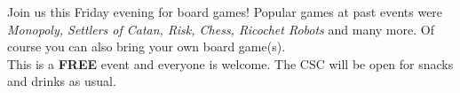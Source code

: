 \documentclass{article}
\begin{document}


Join us this Friday evening for board games! Popular games at past events were \emph{Monopoly, Settlers of Catan, Risk, Chess, Ricochet Robots} and many more. Of course you can also bring your own board game(s).\\

This is a \textbf{FREE} event and everyone is welcome. The CSC will be open for snacks and drinks as usual.

\end{document}
